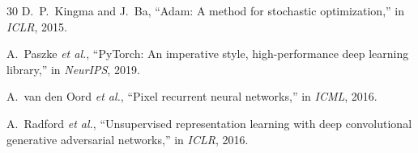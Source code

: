 \documentclass[conference]{IEEEtran}
\begin{document}
\begin{thebibliography}{30}
D.~P.~Kingma and J.~Ba, ``Adam: A method for stochastic optimization,'' in \textit{ICLR}, 2015.

A.~Paszke \textit{et al.}, ``PyTorch: An imperative style, high-performance deep learning library,'' in \textit{NeurIPS}, 2019.

A.~van den Oord \textit{et al.}, ``Pixel recurrent neural networks,'' in \textit{ICML}, 2016.

A.~Radford \textit{et al.}, ``Unsupervised representation learning with deep convolutional generative adversarial networks,'' in \textit{ICLR}, 2016.

\end{thebibliography}
\end{document}
